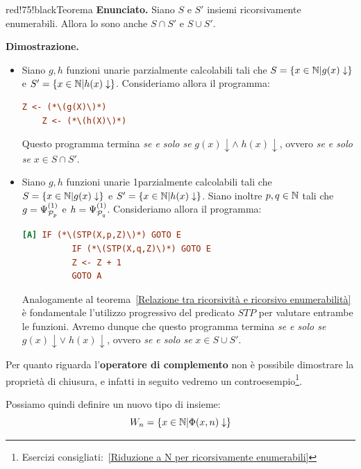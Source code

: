 \begin{halfframedbox}{red!75!black}{Teorema}
  \textbf{Enunciato. } Siano \(S\) e \(S'\) insiemi ricorsivamente enumerabili. Allora lo sono anche \(S\cap S'\) e \(S\cup S'\).
  \begin{center}
    \textcolor{red!75!black}{\hdashrule[0.5ex]{18cm}{1pt}{3mm 3pt 1mm 2pt}}
  \end{center}
  \textbf{Dimostrazione. }
  \begin{itemize}
    \item[\(\cap \):] Siano \(g,h\) funzioni unarie  parzialmente calcolabili tali che \(S=\displaystyle{\left\{{x \in \mathbb{N}\vert g(x) \downarrow}\right\}}\) e \(S'=\displaystyle{\left\{{x \in \mathbb{N}\vert h(x) \downarrow}\right\}}\). Consideriamo allora il programma:
    \begin{lstlisting}[language= ini, caption = { }, nolol]
    Z <- (*\(g(X)\)*)
    Z <- (*\(h(X)\)*)
    \end{lstlisting}
    Questo programma termina \textit{se e solo se} \(g(x)\downarrow\land \; h(x)\downarrow\), ovvero \textit{se e solo se} \(x\in S\cap S'\).
    \item [\(\cup \):] Siano \(g,h\) funzioni unarie  1parzialmente calcolabili tali che \(S=\displaystyle{\left\{{x \in \mathbb{N}\vert g(x) \downarrow}\right\}}\) e \(S'=\displaystyle{\left\{{x \in \mathbb{N}\vert h(x) \downarrow}\right\}}\). Siano inoltre \(p,q\in\mathbb{N}\) tali che \(g=\Psi_{\mathcal{P}_p}^{(1)}\) e \(h=\Psi_{\mathcal{P}_q}^{(1)}\). Consideriamo allora il programma:
    \begin{lstlisting}[language= ini, caption = { }, nolol]
      [A] IF (*\(STP(X,p,Z)\)*) GOTO E
          IF (*\(STP(X,q,Z)\)*) GOTO E
          Z <- Z + 1
          GOTO A
    \end{lstlisting}
    Analogamente al teorema~\ref{Relazione tra ricorsività e ricorsivo enumerabilità} è fondamentale l'utilizzo progressivo del predicato \(STP\) per valutare entrambe le funzioni. Avremo dunque che questo programma termina \textit{se e solo se} \(g(x)\downarrow \lor \; h(x)\downarrow\), ovvero \textit{se e solo se} \(x\in S\cup S'\).
  \end{itemize}
\end{halfframedbox}

Per quanto riguarda l'\textbf{operatore di complemento} non è possibile dimostrare la proprietà di chiusura, e infatti in seguito vedremo un controesempio\footnote{Esercizi consigliati:~\ref{Riduzione a N per ricorsivamente enumerabili}}.

Possiamo quindi definire un nuovo tipo di insieme:
\begin{equation}
  W_n=\displaystyle{\left\{{x \in \mathbb{N}\vert \Phi(x, n) \downarrow}\right\}}
\end{equation}

